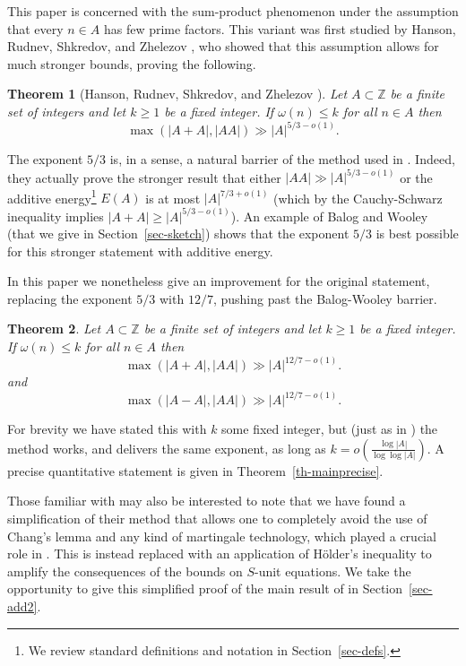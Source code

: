 \documentclass{amsart}
\renewcommand{\leq}{\leqslant}
\renewcommand{\geq}{\geqslant}
\newcommand{\bbz}{\mathbb{Z}}
\newcommand{\abs}[1]{\left\lvert #1\right\rvert}
\newtheorem{theorem}{Theorem}
\theoremstyle{definition}
\begin{document}
This paper is concerned with the sum-product phenomenon under the assumption that every $n\in A$ has few prime factors. This variant was first studied by Hanson, Rudnev, Shkredov, and Zhelezov \cite{HRSZ25}, who showed that this assumption allows for much stronger bounds, proving the following.
\begin{theorem}[Hanson, Rudnev, Shkredov, and Zhelezov \cite{HRSZ25}]\label{th-old}
Let $A\subset \bbz$ be a finite set of integers and let $k\geq 1$ be a fixed integer. If $\omega(n)\leq k$ for all $n\in A$ then
\[\max(\abs{A+A},\abs{AA})\gg \abs{A}^{5/3-o(1)}.\]
\end{theorem}
The exponent $5/3$ is, in a sense, a natural barrier of the method used in \cite{HRSZ25}. Indeed, they actually prove the stronger result that either $\abs{AA}\gg \abs{A}^{5/3-o(1)}$ or the additive energy\footnote{We review standard definitions and notation in Section~\ref{sec-defs}.} $E(A)$ is at most $\abs{A}^{7/3+o(1)}$ (which by the Cauchy-Schwarz inequality implies $\abs{A+A}\geq \abs{A}^{5/3-o(1)}$). An example of Balog and Wooley \cite{BaWo17} (that we give in Section~\ref{sec-sketch}) shows that the exponent $5/3$ is best possible for this stronger statement with additive energy.


In this paper we nonetheless give an improvement for the original statement, replacing the exponent $5/3$ with $12/7$, pushing past the Balog-Wooley barrier.

\begin{theorem}\label{th-main}
Let $A\subset \bbz$ be a finite set of integers and let $k\geq 1$ be a fixed integer. If $\omega(n)\leq k$ for all $n\in A$ then
\[\max(\abs{A+A},\abs{AA})\gg \abs{A}^{12/7-o(1)}.\]
and
\[\max(\abs{A-A},\abs{AA})\gg \abs{A}^{12/7-o(1)}.\]
\end{theorem}

For brevity we have stated this with $k$ some fixed integer, but (just as in \cite{HRSZ25}) the method works, and delivers the same exponent, as long as $k=o(\frac{\log \abs{A}}{\log\log \abs{A}})$. A precise quantitative statement is given in Theorem~\ref{th-mainprecise}.

Those familiar with \cite{HRSZ25} may also be interested to note that we have found a simplification of their method that allows one to completely avoid the use of Chang's lemma and any kind of martingale technology, which played a crucial role in \cite{HRSZ25}. This is instead replaced with an application of H\"{o}lder's inequality to amplify the consequences of the bounds on $S$-unit equations. We take the opportunity to give this simplified proof of the main result of \cite{HRSZ25} in Section~\ref{sec-add2}.
\end{document}
